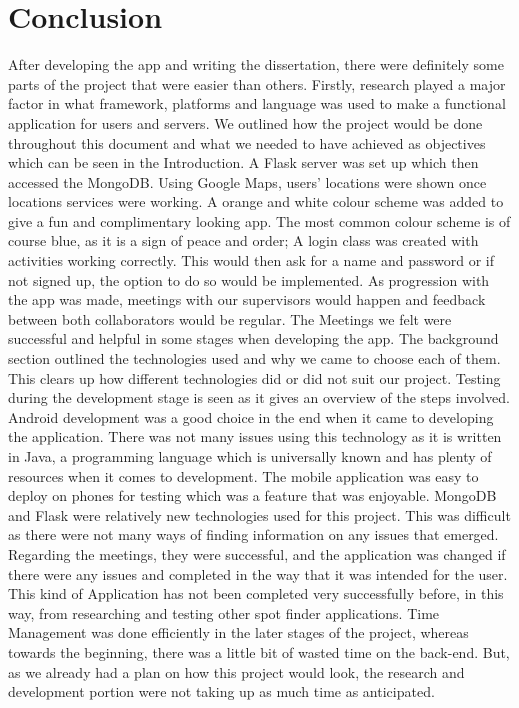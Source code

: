 \chapter{Conclusion}
After developing the app and writing the dissertation, there were definitely some parts of the project that were easier than others. Firstly, research played a major factor in what framework, platforms and language was used to make a functional application for users and servers. We outlined how the project would be done throughout this document and what we needed to have achieved as objectives which can be seen in the Introduction. A Flask server was set up which then accessed the MongoDB.
Using Google Maps, users’ locations were shown once locations services were working. A orange and white colour scheme was added to give a fun and complimentary looking app. The most common colour scheme is of course blue, as it is a sign of peace and order; A login class was created with activities working correctly. This would then ask for a name and password or if not signed up, the option to do so would be implemented. As progression with the app was made, meetings with our supervisors would happen and feedback between both collaborators would be regular. The Meetings we felt were successful and helpful in some stages when developing the app. The background section outlined the technologies used and why we came to choose each of them. This clears up how different technologies did or did not suit our project. Testing during the development stage is seen as it gives an overview of the steps involved. 
Android development was a good choice in the end when it came to developing the application. There was not many issues using this technology as it is written in Java, a programming language which is universally known and has plenty of resources when it comes to development. The mobile application was easy to deploy on phones for testing which was a feature that was enjoyable. MongoDB and Flask were relatively new technologies used for this project. This was difficult as there were not many ways of ﬁnding information on any issues that emerged. Regarding the meetings, they were successful, and the application was changed if there were any issues and completed in the way that it was intended for the user. This kind of Application has not been completed very successfully before, in this way, from researching and testing other spot finder applications.
Time Management was done efficiently in the later stages of the project, whereas towards the beginning, there was a little bit of wasted time on the back-end. But, as we already had a plan on how this project would look, the research and development portion were not taking up as much time as anticipated.
